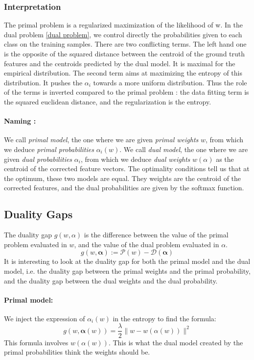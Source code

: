\documentclass{article}
\DeclareMathOperator{\1}{\mathbb{1}}
\begin{document}
\subsubsection{Interpretation}
The primal problem is a regularized maximization of the likelihood of w. 
In the dual problem \ref{dual problem}, we control directly the probabilities given to each class on the training samples.
There are two conflicting terms.
The left hand one is the opposite of the squared distance between the centroid of the ground truth features and the centroids predicted by the dual model. It is maximal for the empirical distribution.
The second term aims at maximizing the entropy of this distribution.
It pushes the $\alpha_i$ towards a more uniform distribution.
Thus the role of the terms is inverted compared to the primal problem : the data fitting term is the squared euclidean distance, and the regularization is the entropy.

\paragraph{Naming :} 
We call \textit{primal model}, the one where we are given \textit{primal weights} $w$, from which we deduce \textit{primal probabilities} $\alpha_i(w)$.
We call \textit{dual model}, the one where we are given \textit{dual probabilities} $\alpha_i$, from which we deduce \textit{dual weights} $w(\alpha)$ as the centroid of the corrected feature vectors.
The optimality conditions tell us that at the optimum, these two models are equal.
They weights are the centroid of the corrected features, and the dual probabilities are given by the softmax function.


\subsection{Duality Gaps}

The duality gap $g(w,\alpha)$ is the difference between the value  of the primal problem evaluated in $w$, and the value of the dual problem evaluated in $\alpha$.
\begin{equation*}
	g(w,\bm \alpha) := \mathscr P(w) - \mathscr D(\bm \alpha)
\end{equation*}
It is interesting to look at the duality gap for both the primal model and the dual model, i.e. the duality gap between the primal weights and the primal probability, and the duality gap between the dual weights and the dual probability.

\paragraph{Primal model:}
We inject the expression of $\alpha_i(w)$ in the entropy to find the formula:
\begin{equation}
	\label{primal duality gap}
	g(w,\bm \alpha(w)) = \frac{\lambda}{2} \|w-w(\alpha(w))\|^2
\end{equation}
This formula involves $w(\alpha(w))$.
This is what the dual model created by the primal probabilities think the weights should be. 
\end{document}
